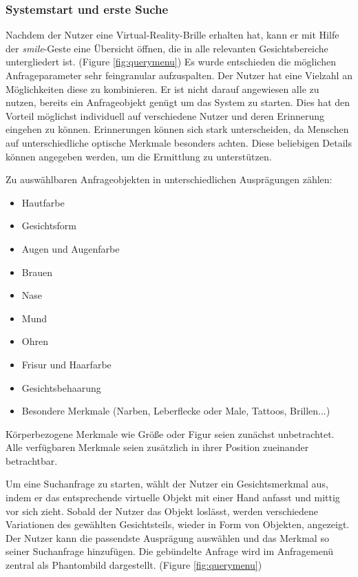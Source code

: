 \documentclass{sigchi-ext}
\begin{document}
\subsubsection{Systemstart und erste Suche}
Nachdem der Nutzer eine Virtual-Reality-Brille erhalten hat, kann er mit Hilfe der \textit{smile}-Geste eine Übersicht öffnen, die in alle relevanten Gesichtsbereiche untergliedert ist. (Figure \ref{fig:querymenu}) Es wurde entschieden die möglichen Anfrageparameter sehr feingranular aufzuspalten. Der Nutzer hat eine Vielzahl an Möglichkeiten diese zu kombinieren. Er ist nicht darauf angewiesen alle zu nutzen, bereits ein Anfrageobjekt genügt um das System zu starten. Dies hat den Vorteil möglichst individuell auf verschiedene Nutzer und deren Erinnerung eingehen zu können. Erinnerungen können sich stark unterscheiden, da Menschen auf unterschiedliche optische Merkmale besonders achten. Diese beliebigen Details können angegeben werden, um die Ermittlung zu unterstützen.

Zu auswählbaren Anfrageobjekten in unterschiedlichen Ausprägungen zählen:
\begin{itemize}
\item Hautfarbe
\item Gesichtsform
\item Augen und Augenfarbe
\item Brauen
\item Nase
\item Mund
\item Ohren
\item Frisur und Haarfarbe
\item Gesichtsbehaarung
\item Besondere Merkmale (Narben, Leberflecke oder Male, Tattoos, Brillen...)
\end{itemize}

Körperbezogene Merkmale wie Größe oder Figur seien zunächst unbetrachtet. Alle verfügbaren Merkmale seien zusätzlich in ihrer Position zueinander betrachtbar.

Um eine Suchanfrage zu starten, wählt der Nutzer ein Gesichtsmerkmal aus, indem er das entsprechende virtuelle Objekt mit einer Hand anfasst und mittig vor sich zieht. Sobald der Nutzer das Objekt loslässt, werden verschiedene Variationen des gewählten Gesichtsteils, wieder in Form von Objekten, angezeigt. Der Nutzer kann die passendste Ausprägung auswählen und das Merkmal so seiner Suchanfrage hinzufügen. Die gebündelte Anfrage wird im Anfragemenü zentral als Phantombild dargestellt. (Figure \ref{fig:querymenu})
\end{document}
